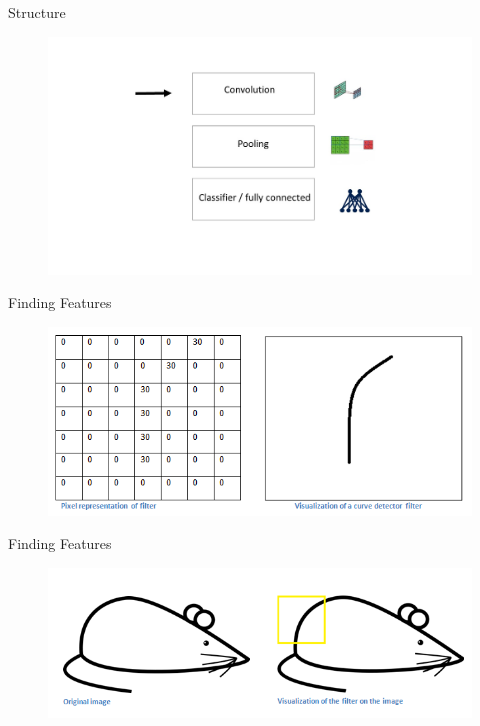 \documentclass[12pt]{beamer}
\begin{document}
\begin{frame}{Structure}
\begin{figure}
\includegraphics[width = 1\linewidth]{images/struct1.jpg}
\label{fig:principle}
\end{figure}
\end{frame}

\begin{frame}{Finding Features}
\begin{figure}
\includegraphics[width = 0.8\linewidth]{images/Filter.png}
\label{fig:principle}
\end{figure}
\end{frame}

\begin{frame}{Finding Features}
\begin{figure}
\includegraphics[width = 0.8\linewidth]{images/mouse.png}
\label{fig:principle}
\end{figure}
\end{frame}
\end{document}
